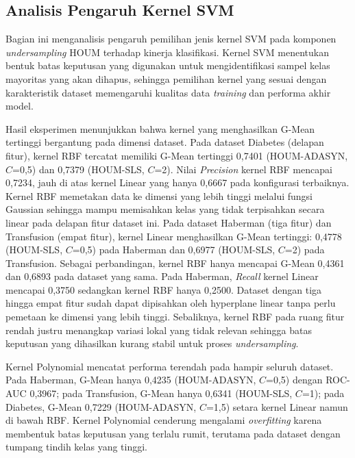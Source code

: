 \subsection{Analisis Pengaruh Kernel SVM} \label{IV.Pengaruh_Kernel}
Bagian ini menganalisis pengaruh pemilihan jenis kernel SVM pada komponen \textit{undersampling} HOUM terhadap kinerja klasifikasi. Kernel SVM menentukan bentuk batas keputusan yang digunakan untuk mengidentifikasi sampel kelas mayoritas yang akan dihapus, sehingga pemilihan kernel yang sesuai dengan karakteristik dataset memengaruhi kualitas data \textit{training} dan performa akhir model. \par

Hasil eksperimen menunjukkan bahwa kernel yang menghasilkan G-Mean tertinggi bergantung pada dimensi dataset. Pada dataset Diabetes (delapan fitur), kernel RBF tercatat memiliki G-Mean tertinggi 0,7401 (HOUM-ADASYN, $C$=0,5) dan 0,7379 (HOUM-SLS, $C$=2). Nilai \textit{Precision} kernel RBF mencapai 0,7234, jauh di atas kernel Linear yang hanya 0,6667 pada konfigurasi terbaiknya. Kernel RBF memetakan data ke dimensi yang lebih tinggi melalui fungsi Gaussian sehingga mampu memisahkan kelas yang tidak terpisahkan secara linear pada delapan fitur dataset ini. Pada dataset Haberman (tiga fitur) dan Transfusion (empat fitur), kernel Linear menghasilkan G-Mean tertinggi: 0,4778 (HOUM-SLS, $C$=0,5) pada Haberman dan 0,6977 (HOUM-SLS, $C$=2) pada Transfusion. Sebagai perbandingan, kernel RBF hanya mencapai G-Mean 0,4361 dan 0,6893 pada dataset yang sama. Pada Haberman, \textit{Recall} kernel Linear mencapai 0,3750 sedangkan kernel RBF hanya 0,2500. Dataset dengan tiga hingga empat fitur sudah dapat dipisahkan oleh hyperplane linear tanpa perlu pemetaan ke dimensi yang lebih tinggi. Sebaliknya, kernel RBF pada ruang fitur rendah justru menangkap variasi lokal yang tidak relevan sehingga batas keputusan yang dihasilkan kurang stabil untuk proses \textit{undersampling}. \par

Kernel Polynomial mencatat performa terendah pada hampir seluruh dataset. Pada Haberman, G-Mean hanya 0,4235 (HOUM-ADASYN, $C$=0,5) dengan ROC-AUC 0,3967; pada Transfusion, G-Mean hanya 0,6341 (HOUM-SLS, $C$=1); pada Diabetes, G-Mean 0,7229 (HOUM-ADASYN, $C$=1,5) setara kernel Linear namun di bawah RBF. Kernel Polynomial cenderung mengalami \textit{overfitting} karena membentuk batas keputusan yang terlalu rumit, terutama pada dataset dengan tumpang tindih kelas yang tinggi. \par

